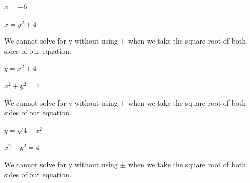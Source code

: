 \documentclass{ximera}
\begin{document}
\begin{question}
\begin{problem}
$x = -6$
\begin{multipleChoice}
\end{multipleChoice}
\end{problem}


\begin{problem}
$x = y^2 + 4$
\begin{multipleChoice}
    \begin{feedback}
        We cannot solve for y without using $\pm$ when we take the square root of both sides of our equation.
    \end{feedback}
\end{multipleChoice}
\end{problem}  

\begin{problem}
$y = x^2 + 4$
\begin{multipleChoice}
\end{multipleChoice}
\end{problem}

\begin{problem}
$x^2 + y^2 = 4$
\begin{multipleChoice}
    \begin{feedback}
        We cannot solve for y without using $\pm$ when we take the square root of both sides of our equation.
    \end{feedback}
\end{multipleChoice}
\end{problem}

\begin{problem}
$y = \sqrt{4-x^2}$
\begin{multipleChoice}
\end{multipleChoice}
\end{problem}

\begin{problem}
$x^2 - y^2 = 4$
\begin{multipleChoice}
    \begin{feedback}
        We cannot solve for y without using $\pm$ when we take the square root of both sides of our equation.
    \end{feedback}
\end{multipleChoice}
\end{problem}


\end{question}
\end{document}
